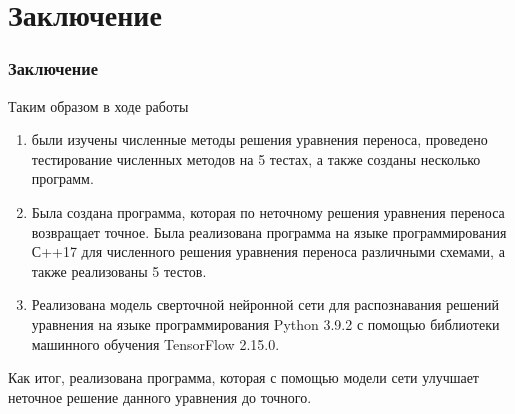 \documentclass{beamer}
\begin{document}
\section{Заключение}

\begin{frame}
\frametitle{Заключение}
\begin{block}{}
	Таким образом в ходе работы
	\begin{enumerate}
		\item были изучены численные методы решения уравнения переноса, проведено тестирование численных методов на 5 тестах, а также созданы несколько программ. 
		\item Была создана программа, которая по неточному решения уравнения переноса возвращает точное. Была реализована программа на языке программирования С++17 для численного решения уравнения переноса различными схемами, а также реализованы 5 тестов. 
		\item  Реализована модель сверточной нейронной сети для распознавания решений уравнения на языке программирования Python 3.9.2 с помощью библиотеки машинного обучения TensorFlow 2.15.0.
	\end{enumerate} 
	
	Как итог, реализована программа, которая с помощью модели сети улучшает неточное решение данного уравнения до точного. 
\end{block}
\end{frame}




	
\end{document}
